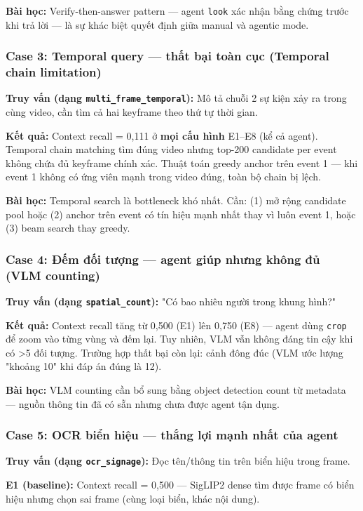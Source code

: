 \documentclass[12pt,a4paper,onecolumn]{article}
\begin{document}
\textbf{Bài học:} Verify-then-answer pattern — agent \texttt{look} xác nhận bằng chứng trước khi trả lời — là sự khác biệt quyết định giữa manual và agentic mode.

\subsubsection{Case 3: Temporal query — thất bại toàn cục (Temporal chain limitation)}

\textbf{Truy vấn (dạng \texttt{multi\_frame\_temporal}):} Mô tả chuỗi 2 sự kiện xảy ra trong cùng video, cần tìm cả hai keyframe theo thứ tự thời gian.

\textbf{Kết quả:} Context recall = 0,111 ở \textbf{mọi cấu hình} E1–E8 (kể cả agent). Temporal chain matching tìm đúng video nhưng top-200 candidate per event không chứa đủ keyframe chính xác. Thuật toán greedy anchor trên event 1 — khi event 1 không có ứng viên mạnh trong video đúng, toàn bộ chain bị lệch.

\textbf{Bài học:} Temporal search là bottleneck khó nhất. Cần: (1) mở rộng candidate pool hoặc (2) anchor trên event có tín hiệu mạnh nhất thay vì luôn event 1, hoặc (3) beam search thay greedy.

\subsubsection{Case 4: Đếm đối tượng — agent giúp nhưng không đủ (VLM counting)}

\textbf{Truy vấn (dạng \texttt{spatial\_count}):} "Có bao nhiêu người trong khung hình?"

\textbf{Kết quả:} Context recall tăng từ 0,500 (E1) lên 0,750 (E8) — agent dùng \texttt{crop} để zoom vào từng vùng và đếm lại. Tuy nhiên, VLM vẫn không đáng tin cậy khi có >5 đối tượng. Trường hợp thất bại còn lại: cảnh đông đúc (VLM ước lượng "khoảng 10" khi đáp án đúng là 12).

\textbf{Bài học:} VLM counting cần bổ sung bằng object detection count từ metadata — nguồn thông tin đã có sẵn nhưng chưa được agent tận dụng.

\subsubsection{Case 5: OCR biển hiệu — thắng lợi mạnh nhất của agent}

\textbf{Truy vấn (dạng \texttt{ocr\_signage}):} Đọc tên/thông tin trên biển hiệu trong frame.

\textbf{E1 (baseline):} Context recall = 0,500 — SigLIP2 dense tìm được frame có biển hiệu nhưng chọn sai frame (cùng loại biển, khác nội dung).
\end{document}
